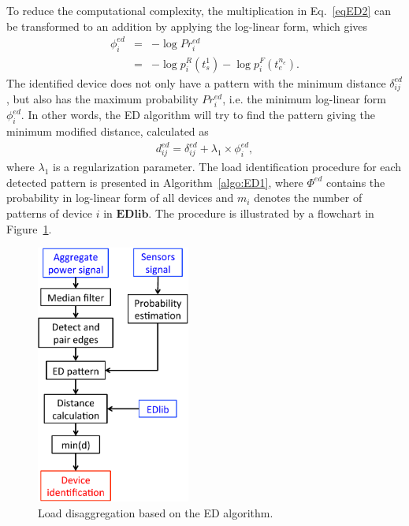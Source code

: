 To reduce the computational complexity, the multiplication in Eq.~\eqref{eqED2} can be transformed to an addition by applying the log-linear form, which gives
\begin{eqnarray}\label{eqED3}
\phi_i^{ed} &=& -\log{Pr_i^{ed}}\nonumber \\
&=& -\log{p_i^R(t_s^1)}-\log{p_i^F(t_e^{n_e})}.
\end{eqnarray}
The identified device does not only have a pattern with the minimum distance $\delta_{ij}^{ed}$, but also has the maximum probability $Pr_i^{ed}$, i.e. the minimum log-linear form $\phi_i^{ed}$. In other words, the ED algorithm will try to find the pattern giving the minimum modified distance, calculated as
\begin{eqnarray}
d_{ij}^{ed} = \delta_{ij}^{ed}+\lambda_1\times \phi_i^{ed},
\end{eqnarray}
where $\lambda_1$ is a regularization parameter. The load identification procedure for each detected pattern is presented in Algorithm~\ref{algo:ED1}, where $\Phi^{ed}$ contains the probability in log-linear form of all devices and $m_i$ denotes the number of patterns of device $i$ in $\mathbf{EDlib}$. The procedure is illustrated by a flowchart in Figure~\ref{fig:ed1}.
\begin{figure}[!h]
\centering
\includegraphics[width=0.45\textwidth]{./chapters/chapter4/images/EDschema.pdf} 
\caption{Load disaggregation based on the ED algorithm.} 
\label{fig:ed1} 
\end{figure}

